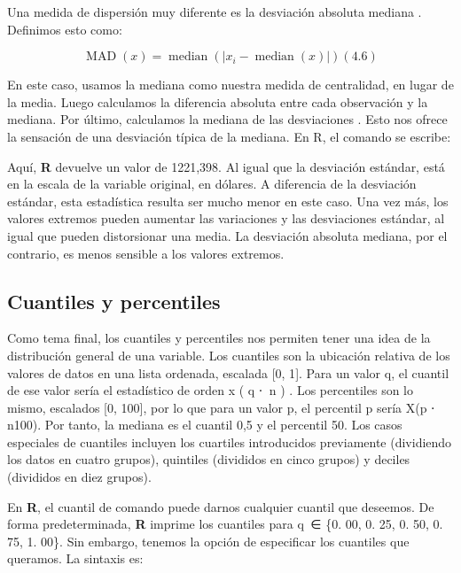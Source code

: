 \documentclass[
]{book}
\newenvironment{Shaded}{\begin{snugshade}}{\end{snugshade}}
\newcommand{\FunctionTok}[1]{\textcolor[rgb]{0.00,0.00,0.00}{#1}}
\newcommand{\NormalTok}[1]{#1}
\newcommand{\SpecialCharTok}[1]{\textcolor[rgb]{0.00,0.00,0.00}{#1}}
\begin{document}
Una medida de dispersión muy diferente es la desviación absoluta mediana . Definimos esto como:

\[
\operatorname{MAD}(x)=\operatorname{median}\left(\left|x_{i}-\operatorname{median}(x)\right|\right)
(4.6)
\]

En este caso, usamos la mediana como nuestra medida de centralidad, en lugar de la media. Luego calculamos la diferencia absoluta entre cada observación y la mediana. Por último, calculamos la mediana de las desviaciones . Esto nos ofrece la sensación de una desviación típica de la mediana. En R, el comando se escribe:

\begin{Shaded}
\end{Shaded}

Aquí, \textbf{R} devuelve un valor de 1221,398. Al igual que la desviación estándar, está en la escala de la variable original, en dólares. A diferencia de la desviación estándar, esta estadística resulta ser mucho menor en este caso. Una vez más, los valores extremos pueden aumentar las variaciones y las desviaciones estándar, al igual que pueden distorsionar una media. La desviación absoluta mediana, por el contrario, es menos sensible a los valores extremos.

\hypertarget{cuantiles-y-percentiles}{%
\subsection*{Cuantiles y percentiles}\label{cuantiles-y-percentiles}}

Como tema final, los cuantiles y percentiles nos permiten tener una idea de la distribución general de una variable. Los cuantiles son la ubicación relativa de los valores de datos en una lista ordenada, escalada {[}0, 1{]}. Para un valor q, el cuantil de ese valor sería el estadístico de orden x ( q ⋅  n ) . Los percentiles son lo mismo, escalados {[}0, 100{]}, por lo que para un valor p, el percentil p sería X(p ⋅ n100). Por tanto, la mediana es el cuantil 0,5 y el percentil 50. Los casos especiales de cuantiles incluyen los cuartiles introducidos previamente (dividiendo los datos en cuatro grupos), quintiles (divididos en cinco grupos) y deciles (divididos en diez grupos).

En \textbf{R}, el cuantil de comando puede darnos cualquier cuantil que deseemos. De forma predeterminada, \textbf{R} imprime los cuantiles para q  ∈ \{0. 00, 0. 25, 0. 50, 0. 75, 1. 00\}. Sin embargo, tenemos la opción de especificar los cuantiles que queramos. La sintaxis es:
\end{document}
